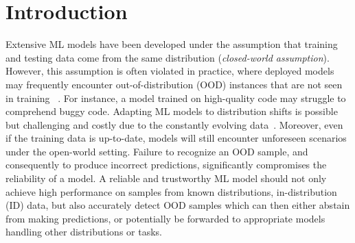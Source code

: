 \section{Introduction}\label{sec:intro}
Extensive ML models have been developed under the assumption that training and testing data come from the same distribution (\ie \textit{closed-world assumption}). However, this assumption is often violated in practice, where deployed models may frequently encounter out-of-distribution (OOD) instances that are not seen in training ~\cite{torralba2011unbiased}. 
For instance, a model trained on high-quality code may struggle to comprehend buggy code. Adapting ML models to distribution shifts is possible but challenging and costly due to the constantly evolving data~\cite{liu2022deep}. Moreover, even if the training data is up-to-date, models will still encounter unforeseen scenarios under the open-world setting. Failure to recognize an OOD sample, and consequently to produce incorrect predictions, significantly compromises the reliability of a model. A reliable and trustworthy ML model should not only achieve high performance on samples from known distributions, \ie in-distribution (ID) data, but also accurately detect OOD samples which can then either abstain from making predictions, or potentially be forwarded to appropriate models handling other distributions or tasks.

